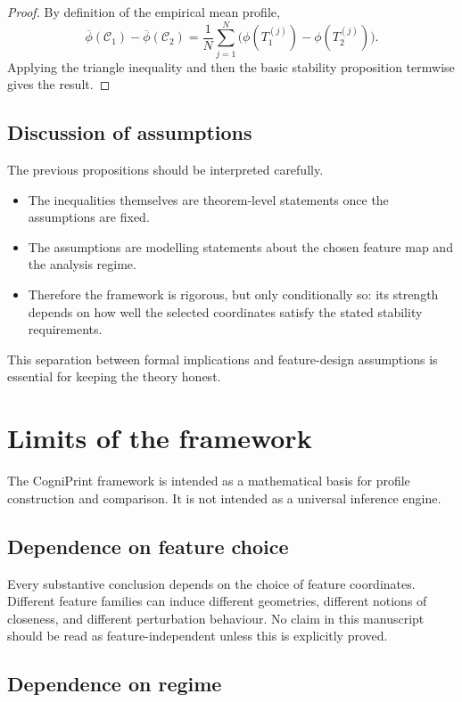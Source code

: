 \documentclass[11pt]{article}
\begin{document}
\begin{proof}
By definition of the empirical mean profile,
\[
\overline{\phi}(\mathcal{C}_1) - \overline{\phi}(\mathcal{C}_2)
=
\frac{1}{N} \sum_{j=1}^{N} \big(\phi(T_1^{(j)}) - \phi(T_2^{(j)})\big).
\]
Applying the triangle inequality and then the basic stability proposition termwise gives the result.
\end{proof}

\subsection{Discussion of assumptions}

The previous propositions should be interpreted carefully.
\begin{itemize}
    \item The inequalities themselves are theorem-level statements once the assumptions are fixed.
    \item The assumptions are modelling statements about the chosen feature map and the analysis regime.
    \item Therefore the framework is rigorous, but only conditionally so: its strength depends on how well the selected coordinates satisfy the stated stability requirements.
\end{itemize}

This separation between formal implications and feature-design assumptions is essential for keeping the theory honest.

\section{Limits of the framework}

The CogniPrint framework is intended as a mathematical basis for profile construction and comparison. It is not intended as a universal inference engine.

\subsection{Dependence on feature choice}

Every substantive conclusion depends on the choice of feature coordinates. Different feature families can induce different geometries, different notions of closeness, and different perturbation behaviour. No claim in this manuscript should be read as feature-independent unless this is explicitly proved.

\subsection{Dependence on regime}
\end{document}
